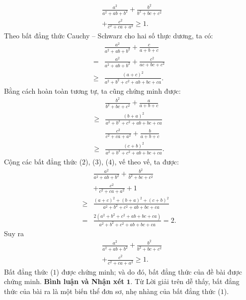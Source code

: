 \begin{multicols}{2}
	\begin{align*}
		&\frac{{{a^2}}}{{{a^2} + ab + {b^2}}} + \frac{{{b^2}}}{{{b^2} + bc + {c^2}}} \\
		&+ \frac{{{c^2}}}{{{c^2} + ca + {a^2}}} \ge 1. \tag{$1$}
	\end{align*}
	Theo bất đẳng thức Cauchy -- Schwarz cho hai số thực dương, ta có:
	\begin{align*}
		&\frac{{{a^2}}}{{{a^2} + ab + {b^2}}} + \frac{c}{{a + b + c}} \\
		= &\frac{{{a^2}}}{{{a^2} + ab + {b^2}}} + \frac{{{c^2}}}{{ac + bc + {c^2}}} \\
		\ge &\frac{{{{\left( {a + c} \right)}^2}}}{{{a^2} + {b^2} + {c^2} + ab + bc + ca}}. \tag{$2$}
	\end{align*}
	Bằng cách hoàn toàn tương tự, ta cũng chứng minh được:
	\begin{align*}
		&\frac{{{b^2}}}{{{b^2} + bc + {c^2}}} + \frac{a}{{a + b + c}} \\
		\ge &\frac{{{{\left( {b + a} \right)}^2}}}{{{a^2} + {b^2} + {c^2} + ab + bc + ca}} \tag{$3$}\\
		&\frac{{{c^2}}}{{{c^2} + ca + {a^2}}} + \frac{b}{{a + b + c}} \\
		\ge &\frac{{{{\left( {c + b} \right)}^2}}}{{{a^2} + {b^2} + {c^2} + ab + bc + ca}}. \tag{$4$}
	\end{align*}
	Cộng các bất đẳng thức ($2$), ($3$), ($4$), vế theo vế, ta được:
	\begin{align*}
		&\frac{{{a^2}}}{{{a^2}+ ab + {b^2}}} + \frac{{{b^2}}}{{{b^2} + bc + {c^2}}} \\
		&+ \frac{{{c^2}}}{{{c^2} + ca + {a^2}}} + 1\\[+1ex]
		\ge &\frac{{{{\left( {a + c} \right)}^2} + {{\left( {b + a} \right)}^2} + {{\left( {c + b} \right)}^2}}}{{{a^2} + {b^2} + {c^2} + ab + bc + ca}}\\[+1ex]
		= &\frac{{2\left( {{a^2} + {b^2} + {c^2} + ab + bc + ca} \right)}}{{{a^2} + {b^2} + {c^2} + ab + bc + ca}} = 2.
	\end{align*}
	Suy ra
	\begin{align*}
		&\frac{{{a^2}}}{{{a^2} + ab + {b^2}}} + \frac{{{b^2}}}{{{b^2} + bc + {c^2}}} \\
		&+ \frac{{{c^2}}}{{{c^2} + ca + {a^2}}} \ge 1.
	\end{align*}
	Bất đẳng thức ($1$) được chứng minh; và do đó, bất đẳng thức của đề bài được chứng minh.
	\vskip 0.05cm
	\textbf{\color{thachthuctoanhoc}Bình luận và Nhận xét}
	\vskip 0.05cm
	$\pmb{1.}$ Từ Lời giải trên dễ thấy, bất đẳng thức của bài ra là một biến thể đơn sơ, nhẹ nhàng của bất đẳng thức ($1$).

\end{multicols}
